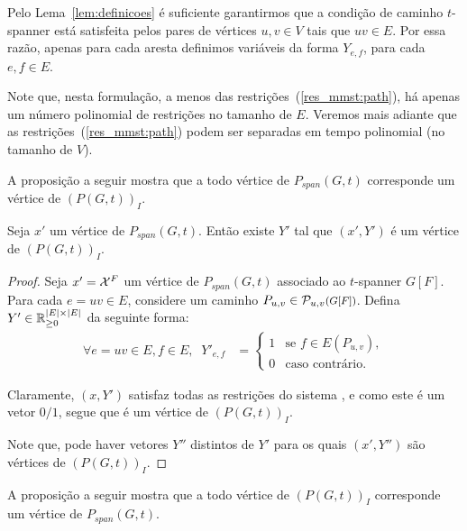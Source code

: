 Pelo Lema~\ref{lem:definicoes} é suficiente garantirmos que 
a condição de caminho $t$-spanner está satisfeita pelos pares de vértices 
$u,v \in V$ tais que $uv \in E$. Por essa razão, apenas para cada aresta definimos 
variáveis da forma $Y_{e,f}$, para cada $e,f \in E$. 

Note que, nesta formulação, a menos das
restrições~(\ref{res_mmst:path}), há apenas um número polinomial de restrições no tamanho de $E$.
Veremos mais adiante que as restrições~(\ref{res_mmst:path}) podem ser
separadas em tempo polinomial (no tamanho de $V$).

A proposição a seguir mostra que a todo vértice de $P_{span}(G,t)$
corresponde um vértice de  $(P(G,t))_{I}$. 


\begin{proposicao}  %
\label{afirm:sol_viavel_lp} 
Seja  $x'$ um vértice de $P_{span}(G,t)$. Então existe $Y'$
tal que $(x', Y')$ é um vértice de $(P(G,t))_{I}$. 
\begin{proof}

  Seja $x' = \mathcal{X}^{F}$ um vértice de $P_{span}(G,t)$ associado ao $t$-spanner $G[F]$. 
Para cada $e=uv \in E$, considere um caminho $P_{u,v} \in \PathuvF$. 
Defina $Y'\in \mathbb{R}^{|E| \times |E|}_{\ge 0}$ da seguinte forma: 
 \begin{align*}
 \forall e=uv \in E, f \in E,\;\; Y'_{e,f}  &=
\begin{cases}
    1& \text{se $f \in E(P_{u,v}),$} \\
    0& \text{caso contrário.}
\end{cases}
\end{align*}

Claramente, $(x, Y')$ satisfaz todas as restrições do sistema
\PGtrestricoes, e como este é um vetor $0/1$, segue que é um vértice de
$(P(G,t))_{I}$. 

Note que, pode haver  vetores $Y''$ distintos de $Y'$ para os quais
$(x', Y'')$ são vértices de $(P(G,t))_{I}$. 

\end{proof}
\end{proposicao}  %

A proposição a seguir mostra que a todo vértice de $(P(G,t))_{I}$ 
corresponde um vértice de $P_{span}(G,t)$. 

